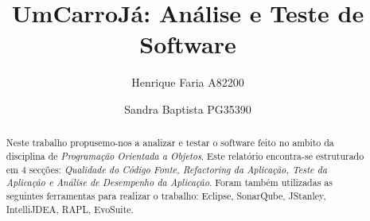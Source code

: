 

\title{UmCarroJá: Análise e Teste de Software}

\author{Henrique Faria A82200 \and Sandra Baptista PG35390}




\maketitle

\begin{abstract}
Neste trabalho propusemo-nos a analizar e testar o software feito no ambito da disciplina de \textit{Programação Orientada a Objetos}.\newline
Este relatório encontra-se estruturado em 4 secções: \textit{Qualidade do Código Fonte, Refactoring da Aplicação, Teste da Aplicação e Análise de Desempenho da Aplicação}.\newline
Foram também utilizadas as seguintes ferramentas para realizar o trabalho:\newline
Eclipse, SonarQube, JStanley, IntelliJDEA, RAPL, EvoSuite.
\end{abstract}




